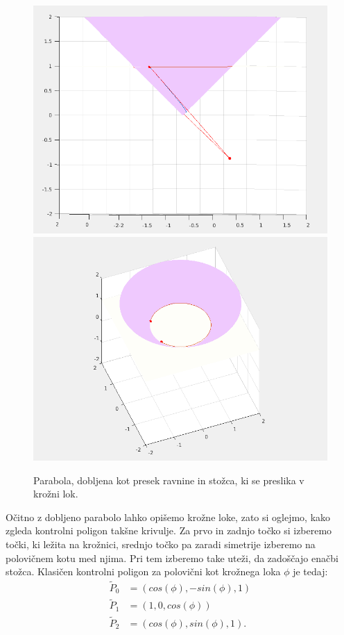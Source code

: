 \documentclass[a4paper,12pt]{article}
\begin{document}
\begin{figure}[h]
\includegraphics[scale=0.23]{kvadraticna.png}
\includegraphics[scale=0.23]{kvadraticna2.png}
\centering
\caption{Parabola, dobljena kot presek ravnine in stožca, ki se preslika v krožni lok.}
\end{figure}

Očitno z dobljeno parabolo lahko opišemo krožne loke, zato si oglejmo, kako zgleda kontrolni poligon takšne krivulje. Za prvo in zadnjo točko si izberemo točki, ki ležita na krožnici, srednjo točko pa zaradi simetrije izberemo na polovičnem kotu med njima. Pri tem izberemo take uteži, da zadoščajo enačbi stožca. Klasičen kontrolni poligon za polovični kot krožnega loka $\phi$ je tedaj:
\begin{align*}
\tilde{P}_0 &= (cos(\phi), -sin(\phi), 1)\\
\tilde{P}_1 &= (1, 0, cos(\phi))\\
\tilde{P}_2 &= (cos(\phi), sin(\phi), 1).
\end{align*}
\end{document}
